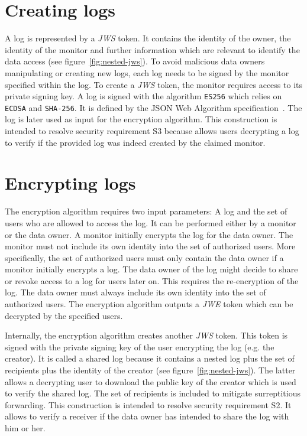 \documentclass[../main.tex]{subfiles}
\begin{document}
\section{Creating logs}
\label{sec:signing}
A log is represented by a \emph{JWS} token.
It contains the identity of the owner, the identity of the monitor and further information which are relevant to identify the data access (see figure~\ref{fig:nested-jws}).
To avoid malicious data owners manipulating or creating new logs, each log needs to be signed by the monitor specified within the log.
To create a \emph{JWS} token, the monitor requires access to its private signing key.
A log is signed with the algorithm \verb|ES256| which relies on \verb|ECDSA| and \verb|SHA-256|.
It is defined by the JSON Web Algorithm specification~\cite{Jones2015}.
The log is later used as input for the encryption algorithm.
This construction is intended to resolve security requirement S3 because allows users decrypting a log to verify if the provided log was indeed created by the claimed monitor.

\section{Encrypting logs}\label{sec:encrypting}

The encryption algorithm requires two input parameters: A log and the set of users who are allowed to access the log.
It can be performed either by a monitor or the data owner.
A monitor initially encrypts the log for the data owner.
The monitor must not include its own identity into the set of authorized users.
More specifically, the set of authorized users must only contain the data owner if a monitor initially encrypts a log.
The data owner of the log might decide to share or revoke access to a log for users later on.
This requires the re-encryption of the log.
The data owner must always include its own identity into the set of authorized users.
The encryption algorithm outputs a \emph{JWE} token which can be decrypted by the specified users.

Internally, the encryption algorithm creates another \emph{JWS} token.
This token is signed with the private signing key of the user encrypting the log (e.g. the creator).
It is called a shared log because it contains a nested log plus the set of recipients plus the identity of the creator (see figure~\ref{fig:nested-jws}).
The latter allows a decrypting user to download the public key of the creator which is used to verify the shared log.
The set of recipients is included to mitigate surreptitious forwarding.
This construction is intended to resolve security requirement S2.
It allows to verify a receiver if the data owner has intended to share the log with him or her.
 
\end{document}
